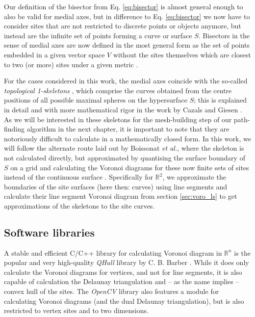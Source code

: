 Our definition of the bisector from Eq. \ref{eq:bisector} is almost general enough to also be valid for medial axes,
but in difference to Eq. \ref{eq:bisector} we now have to consider sites that are not restricted to discrete points or 
objects anymore, but instead are the infinite set of points forming a curve or surface $S$.
Bisectors in the sense of medial axes are now defined in the most general form as the set of points
embedded in a given vector space $V$ without the sites themselves which are closest to two (or more) 
sites under a given metric \cite[p. 244]{Cazals2006}.

For the cases considered in this work, the medial axes coincide with the so-called \textit{topological 1-skeletons} 
\cite{wiki_skeleton, wiki_nskeleton, wiki_medial2} \cite[p. 169]{Berg2008}, which comprise the curves obtained from the centre positions of all possible maximal 
spheres on the hypersurface $S$; this is explained in detail and with more mathematical rigor in the work by 
Cazals and Giesen \cite[pp. 246f]{Cazals2006}.
As we will be interested in these skeletons for the mesh-building step of our path-finding algorithm in the next
chapter, it is important to note that they are notoriously difficult to calculate in a mathematically closed form.
In this work, we will follow the alternate route laid out by Boissonat \textit{et al.}, where the skeleton is 
not calculated directly, but approximated by quantising the surface boundary of $S$ on a grid and calculating 
the Voronoi diagrams for these now finite sets of sites instead of the continuous surface \cite[pp. 109-110]{Boissonnat2006}.
Specifically for $\mathbb{R}^2$, we approximate the boundaries of the site surfaces (here then: curves) 
using line segments and calculate their line segment Voronoi diagram from section \ref{sec:voro_ls} to get 
approximations of the skeletons to the site curves.




\subsection{Software libraries}
\label{sec:voronoi_libs}
A stable and efficient C/C++ library for calculating Voronoi diagram in $\mathbb{R}^n$ is the popular and very 
high-quality \textit{QHull} library by C. B. Barber \cite{web_qhull}. While it does only calculate 
the Voronoi diagrams for vertices, and not for line segments, it is also capable of calculation the Delaunay
triangulation and -- as the name implies -- convex hull of the sites.
The \textit{OpenCV} library \cite{web_opencv} also features a module for calculating Voronoi diagrams
(and the dual Delaunay triangulation), but is also restricted to vertex sites and to two dimensions.

